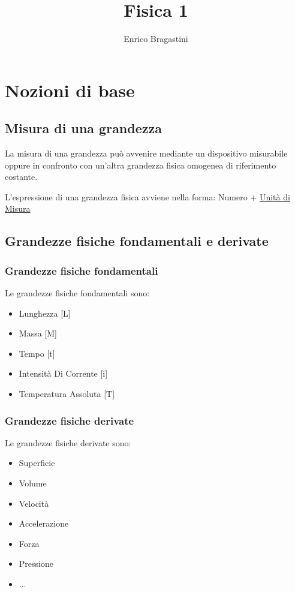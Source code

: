 \documentclass[12pt,oneside]{book}
\title{\Large{\textbf{Fisica 1}}}
\author{Enrico Bragastini}
\begin{document}
\pagestyle{fancy}
\fancyhf{}
\rhead{}
\lhead{\nouppercase\leftmark}
\cfoot{\thepage}
\frontmatter

\maketitle
\tableofcontents

\mainmatter
\chapter{Nozioni di base}
\section{Misura di una grandezza}
La misura di una grandezza può avvenire mediante un dispositivo misurabile
oppure in confronto con un'altra grandezza fisica omogenea di riferimento costante.

L'espressione di una grandezza fisica avviene nella forma: Numero + \underline{Unità di Misura}

\section{Grandezze fisiche fondamentali e derivate}
\subsection{Grandezze fisiche fondamentali}
Le grandezze fisiche fondamentali sono:
\begin{itemize}
    \item Lunghezza                 \tabto{8cm} [L]
    \item Massa                     \tabto{8cm}  [M]
    \item Tempo                     \tabto{8cm}  [t]
    \item Intensità Di Corrente     \tabto{8cm}  [i]
    \item Temperatura Assoluta      \tabto{8cm}  [T]
\end{itemize}

\subsection{Grandezze fisiche derivate}
Le grandezze fisiche derivate sono:
\begin{itemize}
    \item Superficie
    \item Volume
    \item Velocità
    \item Accelerazione
    \item Forza
    \item Pressione
    \item ...
\end{itemize}
\end{document}
